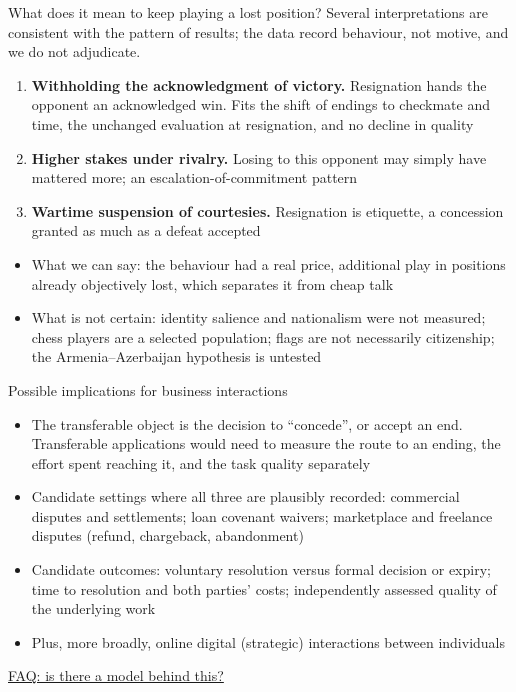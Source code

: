 \documentclass[aspectratio=169,11pt,t]{beamer}
\newcommand{\fq}[2]{\hyperlink{#1}{\textcolor{linkblue}{\scriptsize\textsf{FAQ: #2}}}}
\newcommand{\links}[1]{\vfill\hfill{#1}}
\begin{document}
\begin{frame}{What does it mean to keep playing a lost position?}
  \small
  Several interpretations are consistent with the pattern of results; the data record behaviour, not motive, and we do not adjudicate.
  \begin{enumerate}
    \item \textbf{Withholding the acknowledgment of victory.} Resignation hands the opponent an acknowledged win. Fits the shift of endings to checkmate and time, the unchanged evaluation at resignation, and no decline in quality
    \item \textbf{Higher stakes under rivalry.} Losing to this opponent may simply have mattered more; an escalation-of-commitment pattern
    \item \textbf{Wartime suspension of courtesies.} Resignation is etiquette, a concession granted as much as a defeat accepted
  \end{enumerate}
  \begin{itemize}
    \item What we can say: the behaviour had a real price, additional play in positions already objectively lost, which separates it from cheap talk
    \item What is not certain: identity salience and nationalism were not measured; chess players are a selected population; flags are not necessarily citizenship; the Armenia--Azerbaijan hypothesis is untested
  \end{itemize}
\end{frame}

\begin{frame}{Possible implications for business interactions}
  \begin{itemize}
    \item The transferable object is the decision to ``concede'', or accept an end. Transferable applications would need to measure the route to an ending, the effort spent reaching it, and the task quality separately
    \item Candidate settings where all three are plausibly recorded: commercial disputes and settlements; loan covenant waivers; marketplace and freelance disputes (refund, chargeback, abandonment)
    \item Candidate outcomes: voluntary resolution versus formal decision or expiry; time to resolution and both parties' costs; independently assessed quality of the underlying work
    \item Plus, more broadly, online digital (strategic) interactions between individuals
  \end{itemize}
  \links{\fq{faq-structural}{is there a model behind this?}}
\end{frame}
\end{document}
